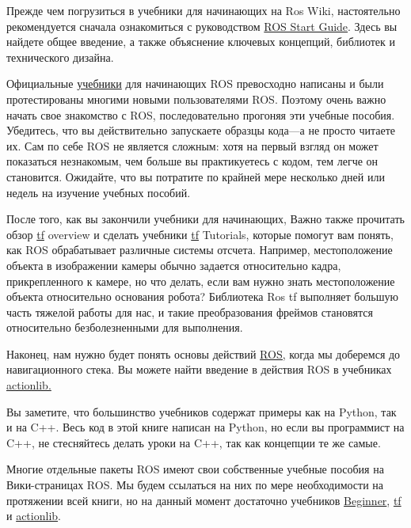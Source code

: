 

Прежде чем погрузиться в учебники для начинающих на Ros Wiki, настоятельно рекомендуется сначала ознакомиться с руководством \href{http://wiki.ros.org/ROS/StartGuide}{ROS Start Guide}. Здесь вы найдете общее введение, а также объяснение ключевых концепций, библиотек и технического дизайна. 

Официальные \href{http://wiki.ros.org/ROS/Tutorials}{учебники} для начинающих ROS превосходно написаны и были протестированы многими новыми пользователями ROS. Поэтому очень важно начать свое знакомство с ROS, последовательно прогоняя эти учебные пособия. Убедитесь, что вы действительно запускаете образцы кода—а не просто читаете их. Сам по себе ROS не является сложным: хотя на первый взгляд он может показаться незнакомым, чем больше вы практикуетесь с кодом, тем легче он становится. Ожидайте, что вы потратите по крайней мере несколько дней или недель на изучение учебных пособий. 

После того, как вы закончили учебники для начинающих, Важно также прочитать обзор \href{http://wiki.ros.org/tf}{tf} overview и сделать учебники \href{http://wiki.ros.org/tf/Tutorials}{tf} Tutorials, которые помогут вам понять, как ROS обрабатывает различные системы отсчета. Например, местоположение объекта в изображении камеры обычно задается относительно кадра, прикрепленного к камере, но что делать, если вам нужно знать местоположение объекта относительно основания робота? Библиотека Ros tf выполняет большую часть тяжелой работы для нас, и такие преобразования фреймов становятся относительно безболезненными для выполнения. 

Наконец, нам нужно будет понять основы действий \href{http://wiki.ros.org/actionlib}{ROS,} когда мы доберемся до навигационного стека. Вы можете найти введение в действия ROS в учебниках \href{http://wiki.ros.org/actionlib/Tutorials}{actionlib.} 

Вы заметите, что большинство учебников содержат примеры как на Python, так и на C++. Весь код в этой книге написан на Python, но если вы программист на C++, не стесняйтесь делать уроки на C++, так как концепции те же самые. 

Многие отдельные пакеты ROS имеют свои собственные учебные пособия на Вики-страницах ROS. Мы будем ссылаться на них по мере необходимости на протяжении всей книги, но на данный момент достаточно учебников \href{http://wiki.ros.org/ROS/Tutorials}{Beginner}, \href{http://wiki.ros.org/tf/Tutorials}{tf} и \href{http://wiki.ros.org/actionlib/Tutorials}{actionlib}.

